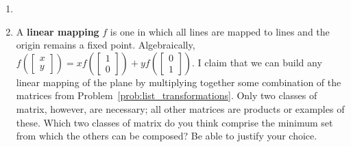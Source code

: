 \documentclass[../textbook.tex]{subfiles}
\begin{document}
\begin{enumerate}
\setcounter{enumi}{\value{problem_i}}
\item[] \begin{enumerate}
\end{enumerate}
\item A \textbf{linear mapping} $f$ is one in which all lines are mapped to lines and the origin remains a fixed point. Algebraically, $f\left(\left[\begin{array}{c}x \\ y \end{array}\right]\right)=xf\left(\left[\begin{array}{c}1 \\ 0 \end{array}\right]\right)+yf\left(\left[\begin{array}{c}0 \\ 1 \end{array}\right]\right).$ I claim that we can build any linear mapping of the plane by multiplying together some combination of the matrices from Problem~\ref{prob:list_transformations}. Only two classes of matrix, however, are necessary; all other matrices are products or examples of these. Which two classes of matrix do you think comprise the minimum set from which the others can be composed? Be able to justify your choice.

\end{enumerate}
\end{document}
